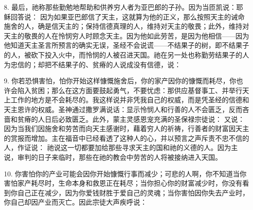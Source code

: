 8. 最后，祂称那些勤勉地帮助和供养穷人者为亚巴郎的子孙。因为当匝凯说：耶稣回答说： 因为如果亚巴郎信了天主，这就算为他的正义，那么按照天主的诫命施舍的人，确是信天主的；保持信德真理的人，维持对天主的敬畏；此外，维持对天主的敬畏的人在怜悯穷人时顾念天主。因为他如此劳苦，是因为他相信——因为他知道天主圣言所预言的确实无误，圣经不会说谎——不结果子的树，即不结果子的人，被砍下投入火中，而怜悯的人被召进天国。祂在另一处也称勤劳结果子的人为忠信的；却把不结果子的、贫瘠的人说成没有信德，说：\par

9. 你若恐惧害怕，怕你开始这样慷慨施舍后，你的家产因你的慷慨而耗尽，你也许会陷入贫困；那么在这方面要鼓起勇气，不要忧虑：那供应基督事工、并举行天上工作的地方是不会耗尽的。我这样说并非凭我自己的权威，而是凭圣经的信德和天主恩许的权威。圣神通过撒罗满说话：显示怜悯人和行善的人不会匮乏，反而吝啬和贫瘠的人日后必致匮乏。此外，蒙主灵感恩宠充满的圣保禄宗徒说： 又说： 因为当我们因施舍和劳苦而向天主感谢时，藉着穷人的祈祷，行善者的财富因天主的赏报而增加。主在福音中已经看透了这种人的心，并以预言之声斥责不忠不信的人，作证说： 祂说这一切都要加给那些寻求天主的国和祂的义德的人。因为主说，审判的日子来临时，那些在祂的教会中劳苦的人将被接纳进入天国。\par

10. 你害怕你的产业可能会因你开始慷慨行事而减少；可悲的人啊，你不知道当你害怕家产耗尽时，生命本身和救恩正在耗尽；当你担心你的财富减少时，你没有看到你自己正在减少，因为你爱钱财胜于爱自己的灵魂；当你害怕因你失去产业时，你自己却因产业而灭亡。因此宗徒大声疾呼说：\par

